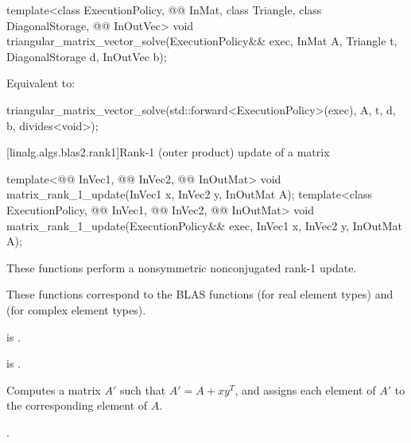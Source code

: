 %
\begin{itemdecl}
template<class ExecutionPolicy,
         @@ InMat, class Triangle, class DiagonalStorage, @@ InOutVec>
  void triangular_matrix_vector_solve(ExecutionPolicy&& exec,
                                      InMat A, Triangle t, DiagonalStorage d, InOutVec b);
\end{itemdecl}

\begin{itemdescr}
\pnum
\effects
Equivalent to:
\begin{codeblock}
triangular_matrix_vector_solve(std::forward<ExecutionPolicy>(exec),
                               A, t, d, b, divides<void>{});
\end{codeblock}
\end{itemdescr}

[linalg.algs.blas2.rank1]{Rank-1 (outer product) update of a matrix}

%
\begin{itemdecl}
template<@@ InVec1, @@ InVec2, @@ InOutMat>
  void matrix_rank_1_update(InVec1 x, InVec2 y, InOutMat A);
template<class ExecutionPolicy, @@ InVec1, @@ InVec2, @@ InOutMat>
  void matrix_rank_1_update(ExecutionPolicy&& exec, InVec1 x, InVec2 y, InOutMat A);
\end{itemdecl}

\begin{itemdescr}
\pnum
These functions perform a nonsymmetric nonconjugated rank-1 update.
\begin{note}
These functions correspond to the BLAS functions
 (for real element types) and
 (for complex element types)\supercite{blas2}.
\end{note}

\pnum
\mandates
{}
is .

\pnum
\expects
{} is .

\pnum
\effects
Computes a matrix $A'$ such that $A' = A + x y^T$,
and assigns each element of $A'$ to the corresponding element of $A$.

\pnum
\complexity
{}.
\end{itemdescr}

